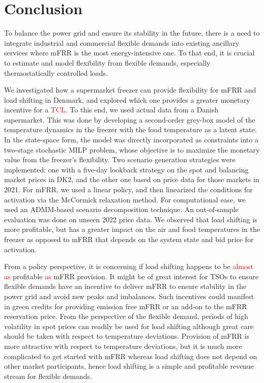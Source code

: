 \documentclass[11pt,a4paper]{article}
\begin{document}
\section{Conclusion}\label{sec:conclusion}

To balance the power grid and ensure its stability in the future, there is a need to integrate industrial and commercial flexible demands into existing ancillary services where mFRR is the most energy-intensive one. To that end, it is crucial to estimate and model flexibility from flexible demands, especially thermostatically controlled loads.

We investigated how a supermarket freezer can provide flexibility for mFRR and load shifting in Denmark, and explored which one provides a greater monetary incentive for a \textcolor{red}{TCL}. To this end, we used actual data  from a Danish supermarket. This was done by developing a second-order grey-box model of the temperature dynamics in the freezer with the food temperature as a latent state. In the state-space form, the model was directly incorporated as constraints into a two-stage stochastic MILP problem, whose objective is to maximize the monetary value from the freezer's flexibility. Two scenario generation strategies were implemented: one with a five-day lookback strategy on the spot and balancing market prices in DK2, and the other one  based on price data for those markets in 2021. For mFRR, we used a linear policy, and then linearized the conditions for activation via the McCormick relaxation method. For computational ease, we used an ADMM-based scenario decomposition technique.  An out-of-sample evaluation was done on unseen 2022 price data. We observed that load shifting is more profitable, but has a greater impact on the air and food temperatures in the freezer as opposed to mFRR that depends on the system state and bid price for activation.

From a policy perspective, it is concerning if load shifting happens to be \textcolor{red}{almost as} profitable \textcolor{red}{as} mFRR provision. It might be of great interest for TSOs to ensure flexible demands have an incentive to deliver mFRR to ensure stability in the power grid and avoid new peaks and imbalances. Such incentives could manifest in green credits for providing emission free mFRR or an add-on to the mFRR reservation price. From the perspective of the flexible demand, periods of high volatility in spot prices can readily be used for load shifting although great care should be taken with respect to temperature deviations. Provision of mFRR is more attractive with respect to temperature deviations, but it is much more complicated to get started with mFRR whereas load shifting does not depend on other market participants, hence load shifting is a simple and profitable revenue stream for flexible demands.
\end{document}
